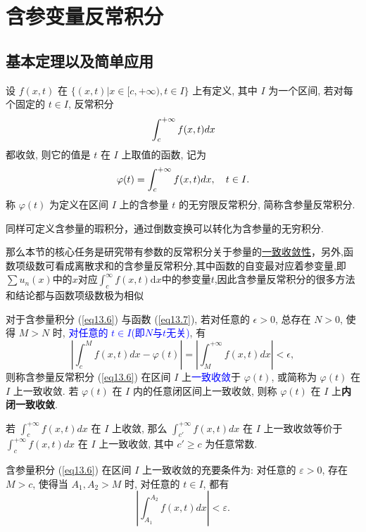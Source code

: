 \documentclass[lang=cn,newtx,10pt,scheme=chinese]{elegantbook}
\begin{document}
\section{含参变量反常积分}

\subsection{基本定理以及简单应用}
\begin{definition}[含参量反常积分]
设 $f(x,t)$ 在 $\{(x,t) | x \in [c, +\infty), t \in I\}$ 上有定义, 其中 $I$ 为一个区间, 若对每个固定的 $t \in I$, 反常积分
\begin{equation}{\label{eq13.6}}
\int_{c}^{+\infty} f(x,t) dx 
\end{equation}
都收敛, 则它的值是 $t$ 在 $I$ 上取值的函数, 记为
\begin{equation}{\label{eq13.7}}
\varphi(t) = \int_{c}^{+\infty} f(x,t) dx, \quad t \in I.   
\end{equation}
称 $\varphi(t)$ 为定义在区间 $I$ 上的含参量 $t$ 的无穷限反常积分, 简称含参量反常积分.
\end{definition}

\begin{remark}
    同样可定义含参量的瑕积分，通过倒数变换可以转化为含参量的无穷积分.

    
    那么本节的核心任务是研究带有参数的反常积分关于参量的\underline{一致收敛性}，另外,函数项级数可看成离散求和的含参量反常积分,其中函数的自变最对应着参变量,即$\sum u_n(x)$中的$x$对应$\int_{c}^{\infty}f(x,t)\mathrm d x$中的参变量$t$,因此含参量反常积分的很多方法和结论都与函数项级数极为相似
\end{remark}

\begin{definition}[含参量反常积分的一致收敛]
对于含参量积分 (\ref{eq13.6}) 与函数 (\ref{eq13.7}), 若对任意的 $\epsilon > 0$, 总存在 $N > 0$, 使得 $M > N$ 时, \textcolor{blue}{对任意的 $t \in I$(即$N$与$t$无关)}, 有
$$ \left| \int_{c}^{M} f(x,t) dx - \varphi(t) \right| = \left| \int_{M}^{+\infty} f(x,t) dx \right| < \epsilon, $$
则称含参量反常积分 (\ref{eq13.6}) 在区间 $I$ 上\textcolor{blue}{一致收敛}于 $\varphi(t)$, 或简称为 $\varphi(t)$ 在 $I$ 上一致收敛. 若 $\varphi(t)$ 在 $I$ 内的任意闭区间上一致收敛, 则称 $\varphi(t)$ 在 $I$ 上\textbf{内闭一致收敛}.
\end{definition}

\begin{remark}
若 $\int_{c}^{+\infty} f(x,t) dx$ 在 $I$ 上收敛, 那么 $\int_{c'}^{+\infty} f(x,t) dx$ 在 $I$ 上一致收敛等价于 $\int_{c}^{+\infty} f(x,t) dx$ 在 $I$ 上一致收敛, 其中 $c' \ge c$ 为任意常数.
\end{remark}
\begin{theorem}[柯西准则]
含参量积分 (\ref{eq13.6}) 在区间 $I$ 上一致收敛的充要条件为: 对任意的 $\varepsilon > 0$, 存在 $M > c$, 使得当 $A_1, A_2 > M$ 时, 对任意的 $t \in I$, 都有
$$ \left| \int_{A_1}^{A_2} f(x,t) dx \right| < \varepsilon. $$
\end{theorem}
\end{document}
